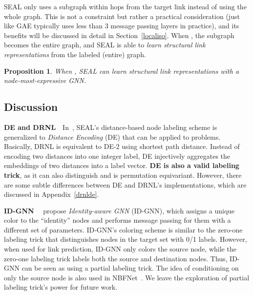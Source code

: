 \documentclass{article}
\newtheorem{proposition}{Proposition}
\begin{document}
SEAL only uses a subgraph  within  hops from the target link instead of using the whole graph. This is not a constraint but rather a practical consideration (just like GAE typically uses less than 3 message passing layers in practice), and its benefits will be discussed in detail in Section~\ref{localiso}. When , the subgraph becomes the entire graph, and SEAL is able to \textit{learn structural link representations} from the labeled (entire) graph. \begin{proposition}
When , SEAL can learn structural link representations with a node-most-expressive GNN.
\end{proposition}



\subsection{Discussion}\label{sec:discussion}

\noindent\textbf{DE and DRNL}~~In~\citep{li2020distance}, SEAL's distance-based node labeling scheme is generalized to \textit{Distance Encoding} (DE) that can be applied to  problems. Basically, DRNL is equivalent to DE-2 using shortest path distance. Instead of encoding two distances into one integer label, DE injectively aggregates the embeddings of two distances into a label vector. \textbf{DE is also a valid labeling trick}, as it can also distinguish  and is permutation equivariant. However, there are some subtle differences between DE and DRNL's implementations, which are discussed in Appendix~\ref{drnlde}.













\noindent\textbf{ID-GNN}~~\citet{you2021identity} propose \textit{Identity-aware GNN} (ID-GNN), which assigns a unique color to the ``identity'' nodes and performs message passing for them with a different set of parameters. ID-GNN's coloring scheme is similar to the zero-one labeling trick that distinguishes nodes in the target set with 0/1 labels. However, when used for link prediction, ID-GNN only colors the source node, while the zero-one labeling trick labels both the source and destination nodes. Thus, ID-GNN can be seen as using a partial labeling trick. The idea of conditioning on only the source node is also used in NBFNet~\citep{zhu2021neural}. We leave the exploration of partial labeling trick's power for future work.
\end{document}
